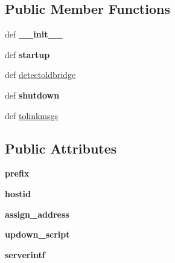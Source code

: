 \subsection*{Public Member Functions}
\begin{DoxyCompactItemize}
\item 
\hypertarget{classcore_1_1netns_1_1nodes_1_1_ctrl_net_a97cb481e1c451928437daa7d7a9eef62}{def {\bfseries \+\_\+\+\_\+init\+\_\+\+\_\+}}\label{classcore_1_1netns_1_1nodes_1_1_ctrl_net_a97cb481e1c451928437daa7d7a9eef62}

\item 
\hypertarget{classcore_1_1netns_1_1nodes_1_1_ctrl_net_a661e8ad09445f1ded327e994c26656d1}{def {\bfseries startup}}\label{classcore_1_1netns_1_1nodes_1_1_ctrl_net_a661e8ad09445f1ded327e994c26656d1}

\item 
def \hyperlink{classcore_1_1netns_1_1nodes_1_1_ctrl_net_af9f77b11ce96cced8d07f8da4dadaf7a}{detectoldbridge}
\item 
\hypertarget{classcore_1_1netns_1_1nodes_1_1_ctrl_net_a7231e1cc456919a1cac52d0b69a27ac5}{def {\bfseries shutdown}}\label{classcore_1_1netns_1_1nodes_1_1_ctrl_net_a7231e1cc456919a1cac52d0b69a27ac5}

\item 
def \hyperlink{classcore_1_1netns_1_1nodes_1_1_ctrl_net_a11ffa41dafbcdd08fef4d4fc91cfb1ff}{tolinkmsgs}
\end{DoxyCompactItemize}
\subsection*{Public Attributes}
\begin{DoxyCompactItemize}
\item 
\hypertarget{classcore_1_1netns_1_1nodes_1_1_ctrl_net_a3dfab78501748600638a6e384bf01bd2}{{\bfseries prefix}}\label{classcore_1_1netns_1_1nodes_1_1_ctrl_net_a3dfab78501748600638a6e384bf01bd2}

\item 
\hypertarget{classcore_1_1netns_1_1nodes_1_1_ctrl_net_ad1dc7226d6968a1ab25654c0a747f41a}{{\bfseries hostid}}\label{classcore_1_1netns_1_1nodes_1_1_ctrl_net_ad1dc7226d6968a1ab25654c0a747f41a}

\item 
\hypertarget{classcore_1_1netns_1_1nodes_1_1_ctrl_net_a7017850616d01b10575061a719559126}{{\bfseries assign\+\_\+address}}\label{classcore_1_1netns_1_1nodes_1_1_ctrl_net_a7017850616d01b10575061a719559126}

\item 
\hypertarget{classcore_1_1netns_1_1nodes_1_1_ctrl_net_a9961791f45344124fdbe20c4980a069e}{{\bfseries updown\+\_\+script}}\label{classcore_1_1netns_1_1nodes_1_1_ctrl_net_a9961791f45344124fdbe20c4980a069e}

\item 
\hypertarget{classcore_1_1netns_1_1nodes_1_1_ctrl_net_aca6ac2fd2f8ff383eeb2134739ae8be8}{{\bfseries serverintf}}\label{classcore_1_1netns_1_1nodes_1_1_ctrl_net_aca6ac2fd2f8ff383eeb2134739ae8be8}

\end{DoxyCompactItemize}
